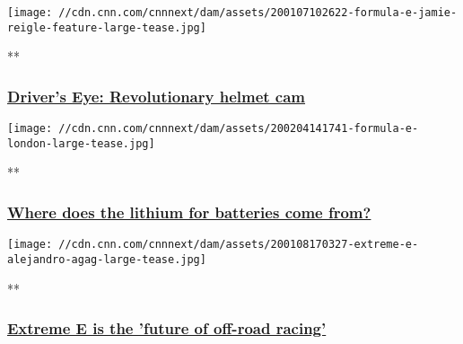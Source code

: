 \href{/videos/sports/2020/02/05/formula-e-fia-drivers-eye-camera-electric-car-supercharged-vision-spt-intl-lon-orig.cnn}{}

\texttt{[image: //cdn.cnn.com/cnnnext/dam/assets/200107102622-formula-e-jamie-reigle-feature-large-tease.jpg]}

**

\hypertarget{drivers-eye-revolutionary-helmet-cam}{%
\subsubsection{\texorpdfstring{\href{/videos/sports/2020/02/05/formula-e-fia-drivers-eye-camera-electric-car-supercharged-vision-spt-intl-lon-orig.cnn}{Driver's
Eye: Revolutionary helmet
cam}}{Driver's Eye: Revolutionary helmet cam}}\label{drivers-eye-revolutionary-helmet-cam}}

\href{/videos/sports/2020/02/04/formula-e-fia-lithium-battery-electric-car-chile-supercharged-spt-intl-lon-orig.cnn}{}

\texttt{[image: //cdn.cnn.com/cnnnext/dam/assets/200204141741-formula-e-london-large-tease.jpg]}

**

\hypertarget{where-does-the-lithium-for-batteries-come-from}{%
\subsubsection{\texorpdfstring{\href{/videos/sports/2020/02/04/formula-e-fia-lithium-battery-electric-car-chile-supercharged-spt-intl-lon-orig.cnn}{Where
does the lithium for batteries come
from?}}{Where does the lithium for batteries come from?}}\label{where-does-the-lithium-for-batteries-come-from}}

\href{/videos/sports/2020/01/08/alejandro-agag-ceo-extreme-e-electric-racing-spt-intl-lon-orig.cnn}{}

\texttt{[image: //cdn.cnn.com/cnnnext/dam/assets/200108170327-extreme-e-alejandro-agag-large-tease.jpg]}

**

\hypertarget{extreme-e-is-the-future-of-off-road-racing}{%
\subsubsection{\texorpdfstring{\href{/videos/sports/2020/01/08/alejandro-agag-ceo-extreme-e-electric-racing-spt-intl-lon-orig.cnn}{Extreme
E is the 'future of off-road
racing'}}{Extreme E is the 'future of off-road racing'}}\label{extreme-e-is-the-future-of-off-road-racing}}

